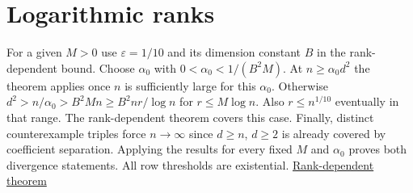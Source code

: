 \section{Logarithmic ranks}

For a given $M>0$ use $\varepsilon=1/10$ and its dimension constant $B$ in the rank-dependent bound. Choose $\alpha_0$ with $0<\alpha_0<1/(B^2M)$. At $n\ge\alpha_0d^2$ the theorem applies once $n$ is sufficiently large for this $\alpha_0$. Otherwise $d^2>n/\alpha_0>B^2 M n\ge B^2 n r/\log n$ for $r\le M\log n$. Also $r\le n^{1/10}$ eventually in that range. The rank-dependent theorem covers this case. Finally, distinct counterexample triples force $n\to\infty$ since $d\ge n$, $d\ge2$ is already covered by coefficient separation. Applying the results for every fixed $M$ and $\alpha_0$ proves both divergence statements. All row thresholds are existential. \href{https://github.com/ProgramComputer/open-math-research/tree/ba7ddfd7efb37cac33769f4fdfed749e1b5bf58a/topics/balanced-arrays/dense-regime/rank-dependent}{Rank-dependent theorem}
